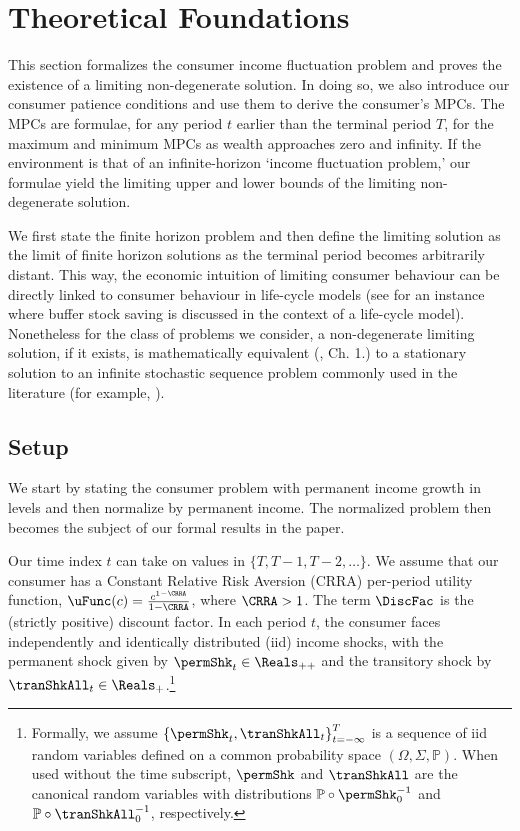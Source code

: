 \documentclass[BufferStockTheory]{subfiles}
\begin{document}

\hypertarget{The-Problem}{}
\section{Theoretical Foundations}\label{sec:Theory}

This section formalizes the consumer income fluctuation problem and proves the existence of a limiting non-degenerate solution. In doing so, we also introduce our consumer patience conditions and use them to derive the consumer's MPCs. The MPCs are formulae, for any period $t$ earlier than the terminal period $T$, for the maximum and minimum MPCs as wealth approaches zero and infinity.  If the environment is that of an infinite-horizon `income fluctuation problem,' our formulae yield the limiting upper and lower bounds of the limiting non-degenerate solution.


We first state the finite horizon problem and then define the limiting solution as the limit of finite horizon solutions as the terminal period becomes arbitrarily distant. This way, the economic intuition of limiting consumer behaviour can be directly linked to consumer behaviour in life-cycle models (see \cite{gpLifeCycle} for an instance where buffer stock saving is discussed in the context of a life-cycle model). Nonetheless for the class of problems we consider, a non-degenerate limiting solution, if it exists, is mathematically equivalent (\cite{bertsekas2012dynamic}, Ch. 1.) to a stationary solution to an infinite stochastic sequence problem commonly used in the literature (for example, \cite{mstIncFluct}). 

\label{sec:Foundations}
\subsection{Setup}\label{subsec:Setup}

We start by stating the consumer problem with permanent income growth in levels and then normalize by permanent income. The normalized problem then becomes the subject of our formal results in the paper. 

Our time index $t$ can take on values in $\{T,T-1,T-2,\dots \}$. We assume that our consumer has a Constant Relative Risk Aversion (CRRA) per-period utility function, $\uFunc(c)=\frac{c^{1-\CRRA}}{1-\CRRA}$, where $\CRRA>1$. The term $\DiscFac$ is the (strictly positive) discount factor. In each period $t$, the consumer faces independently and identically distributed (iid) income shocks, with the permanent shock given by $\permShk_{t} \in \Reals_{++}$ and the transitory shock by $\tranShkAll_{t} \in \Reals_{+}$.\footnote{Formally, we assume $\left\{\permShk_{t},\tranShkAll_{t}\right\}_{t=-\infty}^{T}$ is a sequence of iid random variables defined on a common probability space $(\Omega, \Sigma, \mathbb{P})$. When used without the time subscript, $\permShk$ and $\tranShkAll$ are the canonical random variables with distributions $\mathbb{P}\circ \permShk_{0}^{-1}$ and $\mathbb{P}\circ \tranShkAll_{0}^{-1}$, respectively.}
\end{document}
